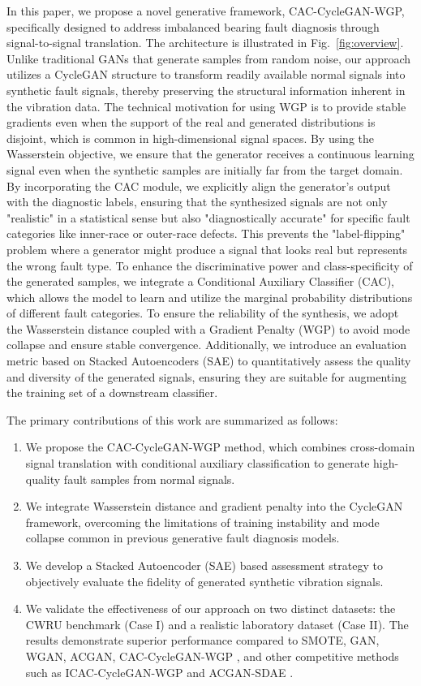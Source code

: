 \documentclass[conference,twocolumn]{IEEEtran}
\begin{document}
In this paper, we propose a novel generative framework, CAC-CycleGAN-WGP, specifically designed to address imbalanced bearing fault diagnosis through signal-to-signal translation. The architecture is illustrated in Fig.~\ref{fig:overview}. Unlike traditional GANs that generate samples from random noise, our approach utilizes a CycleGAN \cite{4} structure to transform readily available normal signals into synthetic fault signals, thereby preserving the structural information inherent in the vibration data. The technical motivation for using WGP is to provide stable gradients even when the support of the real and generated distributions is disjoint, which is common in high-dimensional signal spaces. By using the Wasserstein objective, we ensure that the generator receives a continuous learning signal even when the synthetic samples are initially far from the target domain. By incorporating the CAC module, we explicitly align the generator's output with the diagnostic labels, ensuring that the synthesized signals are not only "realistic" in a statistical sense but also "diagnostically accurate" for specific fault categories like inner-race or outer-race defects. This prevents the "label-flipping" problem where a generator might produce a signal that looks real but represents the wrong fault type. To enhance the discriminative power and class-specificity of the generated samples, we integrate a Conditional Auxiliary Classifier (CAC), which allows the model to learn and utilize the marginal probability distributions of different fault categories. To ensure the reliability of the synthesis, we adopt the Wasserstein distance coupled with a Gradient Penalty (WGP) to avoid mode collapse and ensure stable convergence. Additionally, we introduce an evaluation metric based on Stacked Autoencoders (SAE) \cite{44} to quantitatively assess the quality and diversity of the generated signals, ensuring they are suitable for augmenting the training set of a downstream classifier.

The primary contributions of this work are summarized as follows:
\begin{enumerate}
    \item We propose the CAC-CycleGAN-WGP method, which combines cross-domain signal translation with conditional auxiliary classification to generate high-quality fault samples from normal signals.
    \item We integrate Wasserstein distance and gradient penalty into the CycleGAN framework, overcoming the limitations of training instability and mode collapse common in previous generative fault diagnosis models.
    \item We develop a Stacked Autoencoder (SAE) based assessment strategy to objectively evaluate the fidelity of generated synthetic vibration signals.
    \item We validate the effectiveness of our approach on two distinct datasets: the CWRU benchmark (Case I) and a realistic laboratory dataset (Case II). The results demonstrate superior performance compared to SMOTE, GAN, WGAN, ACGAN, CAC-CycleGAN-WGP \cite{35}, and other competitive methods such as ICAC-CycleGAN-WGP \cite{26} and ACGAN-SDAE \cite{21}.
\end{enumerate}
\end{document}
